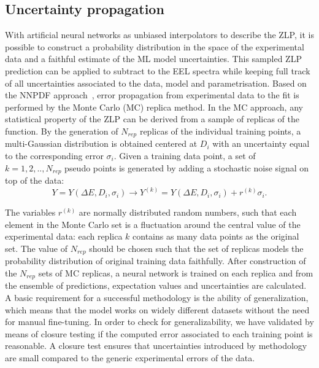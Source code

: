 \subsection{Uncertainty propagation}
With artificial neural networks as unbiased interpolators to describe the ZLP, 
it is possible to construct a probability distribution in the space of 
the experimental data and a faithful estimate of the ML model uncertainties.
%
This sampled ZLP prediction can be applied to subtract to the EEL spectra while
keeping full track of all uncertainties associated to the data, model and parametrisation.
%
Based on the NNPDF approach~\cite{Ball:2008by,Ball:2012cx,Ball:2014uwa,Ball:2017nwa}, 
error propagation from experimental data to the fit is performed by the Monte Carlo (MC)
replica method. 
%
In the MC approach, any statistical property of the ZLP can be derived from a 
sample of replicas of the function. By the generation of $N_{rep}$ replicas 
of the individual training points, a multi-Gaussian distribution is obtained 
centered at $D_i$ with an uncertainty equal to the corresponding error $\sigma_i$. 
%
Given a training data point, a set of $k= 1,2,..,N_{rep}$ pseudo points 
is generated by adding a stochastic noise signal on top of the data: 
\begin{equation}
    Y = Y(\Delta E, D_i,\sigma_i) \rightarrow  Y^{(k)} = Y(\Delta E, D_i,\sigma_i) + r^{(k)}\sigma_i.
\end{equation} 

The variables $r^{(k)}$ are normally distributed random numbers, 
such that each element in the Monte Carlo set is a fluctuation around 
the central value of the experimental data: each replica $k$ contains 
as many data points as the original set. 
%
The value of $N_{rep}$ should be chosen such that the set of replicas 
models the probability distribution of original training data faithfully.
%
After construction of the $N_{rep}$ sets of MC replicas, a neural network is
trained on each replica and from the ensemble of predictions, expectation values
and uncertainties are calculated. \newline
%
A basic requirement for a successful methodology is the ability of generalization, 
which means that the model works on widely different datasets without 
the need for manual fine-tuning.
%
In order to check for generalizability, we have validated by means of 
closure testing\cite{Ball:2015oha} if the computed error 
associated to each training point is reasonable. 
%
A closure test ensures that uncertainties introduced by methodology are small 
compared to the generic experimental errors of the data. 
%

